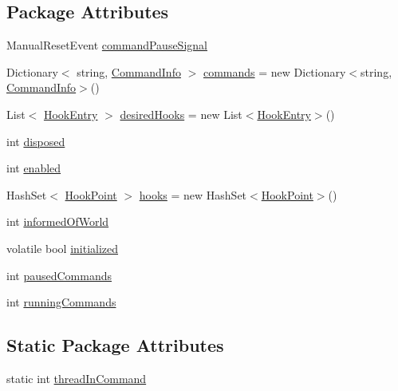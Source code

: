 \subsection*{Package Attributes}
\begin{DoxyCompactItemize}
\item 
Manual\+Reset\+Event \hyperlink{classOTA_1_1Plugin_1_1BasePlugin_a76875f7956f0cf1e003ed7dc7520fd68}{command\+Pause\+Signal}
\item 
Dictionary$<$ string, \hyperlink{classOTA_1_1Command_1_1CommandInfo}{Command\+Info} $>$ \hyperlink{classOTA_1_1Plugin_1_1BasePlugin_ab09400b1ed6abd9b91bde13ab1f22110}{commands} = new Dictionary$<$string, \hyperlink{classOTA_1_1Command_1_1CommandInfo}{Command\+Info}$>$()
\item 
List$<$ \hyperlink{structOTA_1_1Plugin_1_1BasePlugin_1_1HookEntry}{Hook\+Entry} $>$ \hyperlink{classOTA_1_1Plugin_1_1BasePlugin_ad2df02a30b1336c533f72bd58100f994}{desired\+Hooks} = new List$<$\hyperlink{structOTA_1_1Plugin_1_1BasePlugin_1_1HookEntry}{Hook\+Entry}$>$()
\item 
int \hyperlink{classOTA_1_1Plugin_1_1BasePlugin_a0bc82230260cac458c405151f3b2817a}{disposed}
\item 
int \hyperlink{classOTA_1_1Plugin_1_1BasePlugin_a03e6cca0c879c0443efb431c30c14f76}{enabled}
\item 
Hash\+Set$<$ \hyperlink{classOTA_1_1Plugin_1_1HookPoint}{Hook\+Point} $>$ \hyperlink{classOTA_1_1Plugin_1_1BasePlugin_aadf3902b544e8b426ad3b173942ca59d}{hooks} = new Hash\+Set$<$\hyperlink{classOTA_1_1Plugin_1_1HookPoint}{Hook\+Point}$>$()
\item 
int \hyperlink{classOTA_1_1Plugin_1_1BasePlugin_aa6641a8d5e6fa2f2b1428f568702f34f}{informed\+Of\+World}
\item 
volatile bool \hyperlink{classOTA_1_1Plugin_1_1BasePlugin_a4d487bbbc49439c978130e88830836f1}{initialized}
\item 
int \hyperlink{classOTA_1_1Plugin_1_1BasePlugin_a6969992866a91f2f2fd8525f89d30672}{paused\+Commands}
\item 
int \hyperlink{classOTA_1_1Plugin_1_1BasePlugin_a7757944434207e32537d2486e00393e2}{running\+Commands}
\end{DoxyCompactItemize}
\subsection*{Static Package Attributes}
\begin{DoxyCompactItemize}
\item 
static int \hyperlink{classOTA_1_1Plugin_1_1BasePlugin_a8b9ce8ac0dec366381a756a0760ff8ef}{thread\+In\+Command}
\end{DoxyCompactItemize}
